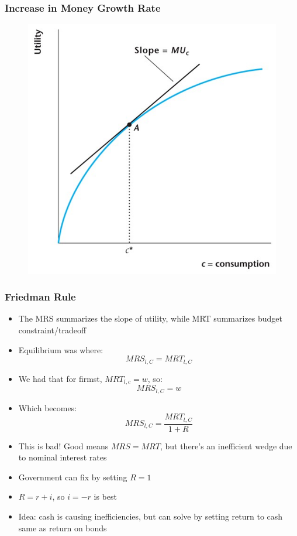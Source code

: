 \documentclass{beamer}
\begin{document}
\begin{frame}
\frametitle[alignment=center]{Increase in Money Growth Rate}
\begin{figure}
\centering
\includegraphics[scale=0.75]{Figures/W_Fig_18pt5.png}
\end{figure}
\end{frame}

\begin{frame}
\frametitle[alignment=center]{Friedman Rule}
\begin{itemize}
\item The MRS summarizes the slope of utility, while MRT summarizes budget constraint/tradeoff
\bigskip
\item Equilibrium was where:
$$MRS_{l,C}=MRT_{l,C}$$
\item We had that for firmst, $MRT_{l,c}=w$, so:
$$MRS_{l,C}=w$$
\item Which becomes:
$$MRS_{l,C}=\frac{MRT_{l,C}}{1+R}$$
\item This is bad!  Good means $MRS=MRT$, but there's an inefficient wedge due to nominal interest rates
\bigskip
\item Government can fix by setting $R=1$
\bigskip
\item $R=r+i$, so $i=-r$ is best
\bigskip
\item Idea: cash is causing inefficiencies, but can solve by setting return to cash same as return on bonds
\end{itemize}
\end{frame}
\end{document}
